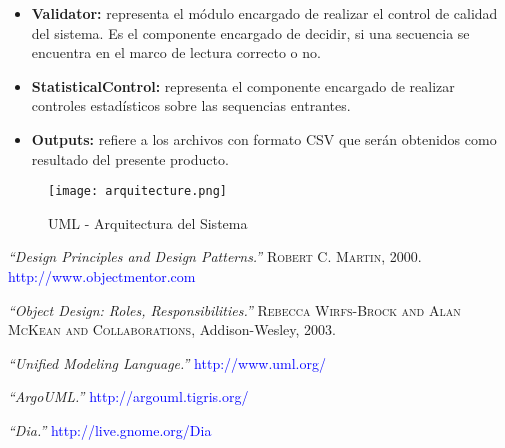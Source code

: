 \documentclass[12pt,a4paper,spanish]{article}
\begin{document}
\begin{itemize}
  \item \textbf{Validator:} representa el módulo encargado de realizar el control de calidad del sistema. Es el componente 	 encargado de decidir, si una secuencia se encuentra en el marco de lectura correcto o no.

  \item \textbf{StatisticalControl:} representa el componente encargado de realizar controles estadísticos sobre las 	 
  sequencias entrantes.

  \item \textbf{Outputs:} refiere a los archivos con formato \textsf{CSV} que serán obtenidos como resultado del presente
  producto.
 
\end{itemize}

\begin{figure}[!hbtp]
	\begin{center}
		\texttt{[image: arquitecture.png]}
		\caption{UML - Arquitectura del Sistema}
		\label{arquitecture}
	\end{center}
\end{figure}







\begin{thebibliography}{99}
\small  {} {\em{“Design Principles and Design Patterns.”}} 
		\textsc{Robert C. Martin}, 2000. \textcolor{blue}{http://www.objectmentor.com}
  
\small  {} {\em{“Object Design: Roles, Responsibilities.”}} 
		\textsc{Rebecca Wirfs-Brock and Alan McKean and Collaborations}, Addison-Wesley, 2003.  

\small  {} {\em{“Unified Modeling Language.”}} \textcolor{blue}{http://www.uml.org/}

\small  {} {\em{“ArgoUML.”}} \textcolor{blue}{http://argouml.tigris.org/}

\small {} {\em{“Dia.”}} \textcolor{blue}{http://live.gnome.org/Dia}
\end{thebibliography}
\end{document}
